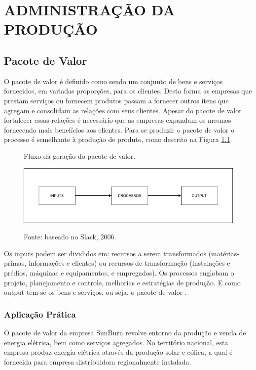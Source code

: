 \chapter{ADMINISTRAÇÃO DA PRODUÇÃO}
\label{chap:admprod}

\section{Pacote de Valor}
\label{sec:pacotevalor}

O pacote de valor é definido como sendo um conjunto de bens e serviços fornecidos, em variadas proporções, para os clientes. Desta forma as empresas que prestam serviços ou fornecem produtos passam a fornecer outros itens que agregam e consolidam as relações com seus clientes.
Apesar do pacote de valor fortalecer essas relações é necessário que as empresas expandam os mesmos fornecendo mais benefícios aos clientes.
Para se produzir o pacote de valor o processo é semelhante à produção de produto, como descrito na Figura \ref{fig:pacotevalor}.

\begin{figure}[H]
    \caption{Fluxo da geração do pacote de valor.}
    \includegraphics[width=\textwidth]{images/pacote_valor.png}
    \label{fig:pacotevalor}
    \caption*{Fonte: baseado no Slack, 2006.}

\end{figure}

Os inputs podem ser divididos em: recursos a serem transformados (matérias-primas, informações e clientes) ou recursos de transformação (instalações e prédios, máquinas e equipamentos, e empregados). Os processos englobam o projeto, planejamento e controle, melhorias e estratégias de produção. E como output tem-se os bens e serviços, ou seja, o pacote de valor \cite{slack2006administraccao}.
\subsection{Aplicação Prática}
\label{subsec:app1}
O pacote de valor da empresa SunBurn revolve entorno da produção e venda de energia elétrica, bem como serviços agregados. No território nacional, esta empresa produz energia elétrica através da produção solar e eólica, a qual é fornecida para empresa distribuidora regionalmente instalada. 

